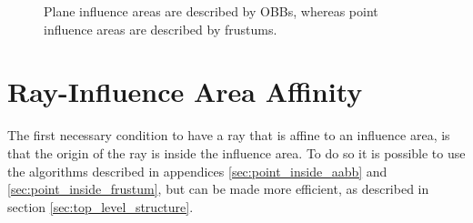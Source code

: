 \documentclass{PoliMi_MasterThesis}
\begin{document}
\begin{figure}[H]
    \centering
	\qquad
    \caption{Plane influence areas are described by OBBs, whereas point influence areas are described by frustums.}
    \label{fig:influence_areas}
\end{figure}

\section{Ray-Influence Area Affinity} \label{sec:ray_influence_area_affinity}
The first necessary condition to have a ray that is affine to an influence area, is that the origin of the ray is inside the influence area. To do so it is possible to use the algorithms described in appendices \ref{sec:point_inside_aabb} and \ref{sec:point_inside_frustum}, but can be made more efficient, as described in section \ref{sec:top_level_structure}.
\end{document}
